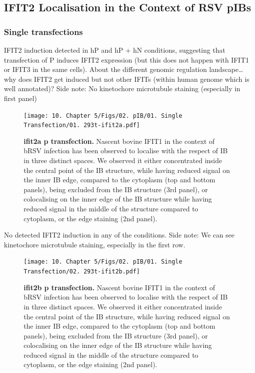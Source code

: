 \subsection{IFIT2 Localisation in the Context of RSV pIBs} \label{subsec:IFIT2 Localisation in the Context of RSV pIBs}
\subsubsection{Single transfections}
IFIT2 induction detected in hP and hP + hN conditions, suggesting that transfection of P induces IFIT2 expression (but this does not happen with IFIT1 or IFIT3 in the same cells).
About the different genomic regulation landscape… why does IFIT2 get induced but not other IFITs (within human genome which is well annotated)? 
Side note: No kinetochore microtubule staining (especially in first panel)

\begin{figure}
    \centering
    \texttt{[image: 10. Chapter 5/Figs/02. pIB/01. Single Transfection/01. 293t-ifit2a.pdf]}
    \caption[ifit2a p transfection]{\textbf{ifit2a p transfection.} Nascent bovine IFIT1 in the context of bRSV infection has been observed to localise with the respect of IB in three distinct spaces. We observed it either concentrated inside the central point of the IB structure, while having reduced signal on the inner IB edge, compared to the cytoplasm (top and bottom panels), being excluded from the IB structure (3rd panel), or colocalising on the inner edge of the IB structure while having reduced signal in the middle of the structure compared to cytoplasm, or the edge staining (2nd panel).}
    \label{fig:ifit2a p transfection}
\end{figure}

No detected IFIT2 induction in any of the conditions.
Side note: We can see kinetochore microtubule staining, especially in the first row.

\begin{figure}
    \centering
    \texttt{[image: 10. Chapter 5/Figs/02. pIB/01. Single Transfection/02. 293t-ifit2b.pdf]}
    \caption[ifit2b p transfection]{\textbf{ifit2b p transfection.} Nascent bovine IFIT1 in the context of bRSV infection has been observed to localise with the respect of IB in three distinct spaces. We observed it either concentrated inside the central point of the IB structure, while having reduced signal on the inner IB edge, compared to the cytoplasm (top and bottom panels), being excluded from the IB structure (3rd panel), or colocalising on the inner edge of the IB structure while having reduced signal in the middle of the structure compared to cytoplasm, or the edge staining (2nd panel).}
    \label{fig:ifit2b p transfection}
\end{figure}

